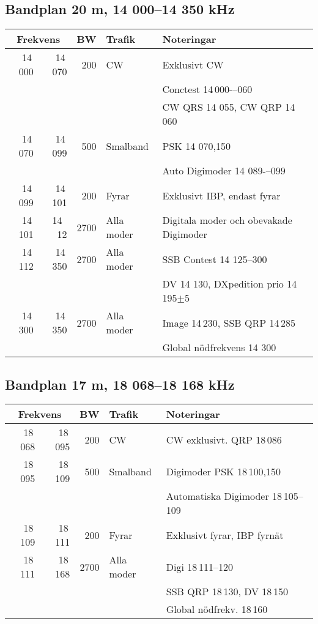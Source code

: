 {\subsection{Bandplan 20 m, 14 000--14 350 kHz}
\begin{tabular}{rrrll}
\multicolumn{2}{c}{\textbf{Frekvens}} & \textbf{BW} & \textbf{Trafik} & \textbf{Noteringar} \\ \hline
14\,000 & 14\,070 & 200  & CW         & Exklusivt CW                             \\
        &         &      &            & Conctest 14\,000-–060                    \\
        &         &      &            & CW QRS 14 055, CW QRP 14\,060            \\ \hline
14\,070 & 14\,099 & 500  & Smalband   & PSK 14 070,150                           \\
        &         &      &            & Auto Digimoder 14 089-–099               \\ \hline
14\,099 & 14\,101 & 200  & Fyrar      & Exklusivt IBP, endast fyrar              \\ \hline
14\,101 & 14 \,12 & 2700 & Alla moder & Digitala moder och obevakade Digimoder   \\ \hline
14\,112 & 14\,350 & 2700 & Alla moder & SSB Contest 14 125--300                  \\
        &         &      &            & DV 14 130, DXpedition prio 14\,195$\pm$5 \\ \hline
14\,300 & 14\,350 & 2700 & Alla moder & Image 14\,230, SSB QRP 14\,285           \\
        &         &      &            & Global nödfrekvens 14 300                \\ \hline
\end{tabular}

\subsection{Bandplan 17 m, 18 068--18 168 kHz}
\begin{tabular}{rrrll}
\multicolumn{2}{c}{\textbf{Frekvens}} & \textbf{BW} & \textbf{Trafik} & \textbf{Noteringar} \\ \hline

18\,068 & 18\,095 & 200  & CW         & CW exklusivt. QRP 18\,086             \\ \hline
18\,095 & 18\,109 & 500  & Smalband   & Digimoder PSK 18\,100,150             \\
        &         &      &            & Automatiska Digimoder 18\,105--109 \\ \hline
18\,109 & 18\,111 & 200  & Fyrar      & Exklusivt fyrar, IBP fyrnät           \\ \hline
18\,111 & 18\,168 & 2700 & Alla moder & Digi 18\,111--120                   \\
        &         &      &            & SSB QRP 18\,130, DV 18\,150           \\
        &         &      &            & Global nödfrekv. 18\,160              \\ \hline
\end{tabular}

}
